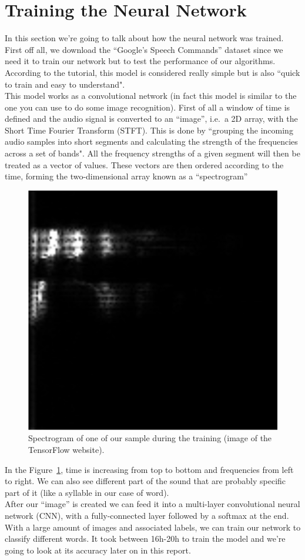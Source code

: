 \documentclass[11pt,a4paper,titlepage]{report}
\begin{document}
\section{Training the Neural Network}
\label{sec:training}
\hspace*{0.6cm}
In this section we're going to talk about how the neural network was trained. First off all, we download the ``Google's Speech Commands'' dataset since we need it to train our network but to test the performance of our algorithms. According to the tutorial, this model is considered really simple but is also ``quick to train and easy to understand".\\
\hspace*{0.6cm}
This model works as a convolutional network (in fact this model is similar to the one you can use to do some image recognition). First of all a window of time is defined and the audio signal is converted to an ``image'', i.e.\ a 2D array, with the Short Time Fourier Transform (STFT). This is done by ``grouping the incoming audio samples into short segments and calculating the strength of the frequencies across a set of bands". All the frequency strengths of a given segment will then be treated as a vector of values. These vectors are then ordered according to the time, forming the two-dimensional array known as a ``spectrogram''\\
\begin{figure}[h]
	\centering
	\includegraphics[width=0.7\linewidth]{Rapport2}
	\caption{Spectrogram of one of our sample during the training (image of the TensorFlow website).}
	\label{fig:spec}
\end{figure}

\hspace*{0.6cm}
In the Figure~\ref{fig:spec}, time is increasing from top to bottom and frequencies from left to right. We can also see different part of the sound that are probably specific part of it (like a syllable in our case of word).\\
\hspace*{0.6cm}
After our ``image'' is created we can feed it into a multi-layer convolutional neural network (CNN), with a fully-connected layer followed by a softmax at the end. With a large amount of images and associated labels, we can train our network to classify different words. It took between 16h-20h to train the model and we're going to look at its accuracy later on in this report.
\end{document}
